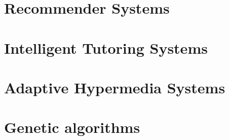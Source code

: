 \section{Recommender Systems}
\section{Intelligent Tutoring Systems}
\section{Adaptive Hypermedia Systems}
\section{Genetic algorithms}
